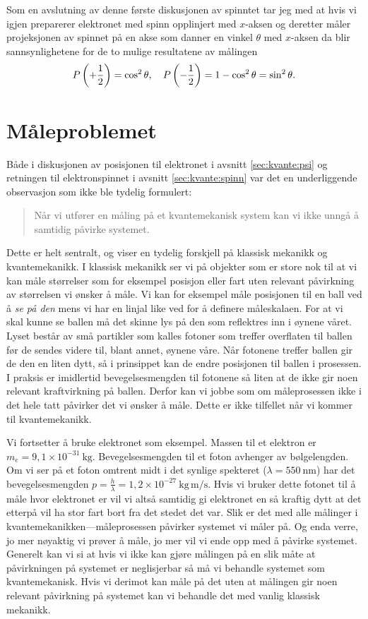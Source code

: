 Som en avslutning av denne første diskusjonen av spinntet tar jeg med at hvis vi igjen preparerer elektronet med spinn opplinjert med $x$-aksen og deretter måler projeksjonen av spinnet på en akse som danner en vinkel $\theta$ med $x$-aksen da blir sannsynlighetene for de to mulige resultatene av målingen
\begin{displaymath}
	P\left(+\frac{1}{2}\right) = \cos^2\theta, \quad P\left(-\frac{1}{2}\right) = 1- \cos^2\theta = \sin^2\theta.
\end{displaymath}

\section{Måleproblemet}
Både i diskusjonen av posisjonen til elektronet i avsnitt \ref{sec:kvante:psi} og retningen til elektronspinnet i avsnitt \ref{sec:kvante:spinn} var det en underliggende observasjon som ikke ble tydelig formulert:
\begin{quote}
Når vi utfører en måling på et kvantemekanisk system kan vi ikke unngå å samtidig påvirke systemet.
\end{quote}
Dette er helt sentralt, og viser en tydelig forskjell på klassisk mekanikk og kvantemekanikk. I klassisk mekanikk ser vi på objekter som er store nok til at vi kan måle størrelser som for eksempel posisjon eller fart uten relevant påvirkning av størrelsen vi ønsker å måle. Vi kan for eksempel måle posisjonen til en ball ved å \emph{se på den} mens vi har en linjal like ved for å definere måleskalaen. For at vi skal kunne se ballen må det skinne lys på den som reflektres inn i øynene våret. Lyset består av små partikler som kalles fotoner som treffer overflaten til ballen før de sendes videre til, blant annet, øynene våre. Når fotonene treffer ballen gir de den en liten dytt, så i prinsippet kan de endre posisjonen til ballen i prosessen. I praksis er imidlertid bevegelsesmengden til fotonene så liten at de ikke gir noen relevant kraftvirkning på ballen. Derfor kan vi jobbe som om måleprosessen ikke i det hele tatt påvirker det vi ønsker å måle. Dette er ikke tilfellet når vi kommer til kvantemekanikk.

Vi fortsetter å bruke elektronet som eksempel. Massen til et elektron er $m_e = 9,1\times10^{-31}~\mathrm{kg}$. Bevegelsesmengden til et foton avhenger av bølgelengden. Om vi ser på et foton omtrent midt i det synlige spekteret ($\lambda = 550~\mathrm{nm}$) har det bevegelsesmengden $p = \frac{h}{\lambda} = 1,2\times10^{-27}~\mathrm{kg\, m/s}$. Hvis vi bruker dette fotonet til å måle hvor elektronet er vil vi altså samtidig gi elektronet en så kraftig dytt at det etterpå vil ha stor fart bort fra det stedet det var. Slik er det med alle målinger i kvantemekanikken---måleprosessen påvirker systemet vi måler på. Og enda verre, jo mer nøyaktig vi prøver å måle, jo mer vil vi ende opp med å påvirke systemet. Generelt kan vi si at hvis vi ikke kan gjøre målingen på en slik måte at påvirkningen på systemet er neglisjerbar så må vi behandle systemet som kvantemekanisk. Hvis vi derimot kan måle på det uten at målingen gir noen relevant påvirkning på systemet kan vi behandle det med vanlig klassisk mekanikk. 

